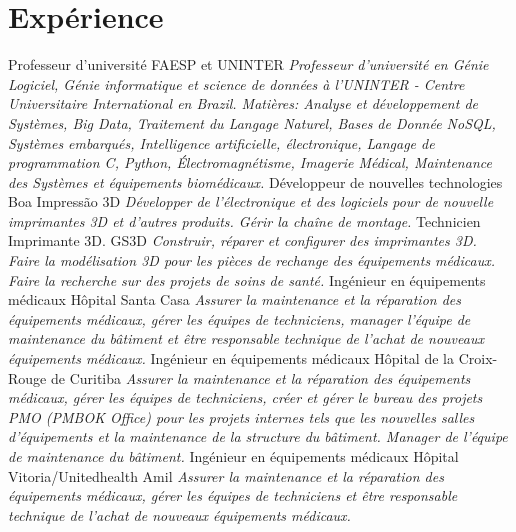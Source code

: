 \documentclass[letterpaper]{twentysecondcv} %
\begin{document}
\newpage %

\makeprofile %


\section{Expérience}

\begin{twenty} %
						{Professeur d'université}
						{FAESP et UNINTER}
						{\emph{Professeur d'université en Génie Logiciel, Génie informatique
						et science de données à l'UNINTER - Centre Universitaire International 
						en Brazil. Matières: Analyse et développement de Systèmes, Big Data,
						Traitement du Langage Naturel, Bases de Donnée NoSQL, 
						Systèmes embarqués, Intelligence artificielle, électronique, Langage 
						de programmation C, Python, Électromagnétisme, Imagerie Médical, 
						Maintenance des Systèmes et équipements biomédicaux.}}
						{Développeur de nouvelles technologies}
						{Boa Impressão 3D}
						{\emph{Développer de l'électronique et des logiciels pour de nouvelle
						imprimantes 3D et d'autres produits. Gérir la chaîne de montage.}}
						{Technicien Imprimante 3D.}
						{GS3D}
						{\emph{Construir, réparer et configurer des imprimantes 3D. Faire la
						modélisation 3D pour les pièces de rechange des équipements médicaux.
						Faire la recherche sur des projets de soins de santé.}}
						{Ingénieur en équipements médicaux}
						{Hôpital Santa Casa}
						{\emph{Assurer la maintenance et la réparation des équipements médicaux, gérer les équipes de techniciens, manager l'équipe de maintenance du bâtiment et être responsable technique de l'achat de nouveaux équipements médicaux.}}
						{Ingénieur en équipements médicaux}
						{Hôpital de la Croix-Rouge de Curitiba}
						{\emph{Assurer la maintenance et la réparation des équipements médicaux, gérer les équipes de techniciens, créer et gérer le bureau des projets PMO (PMBOK Office) pour les projets internes tels que les nouvelles salles d'équipements et la maintenance de la structure du bâtiment. Manager de l'équipe de maintenance du bâtiment.}}
						{Ingénieur en équipements médicaux}
						{Hôpital Vitoria/Unitedhealth Amil}
						{\emph{Assurer la maintenance et la réparation des équipements médicaux, gérer les équipes de techniciens et être responsable technique de l'achat de nouveaux équipements médicaux.}}
\end{twenty}
\end{document}

